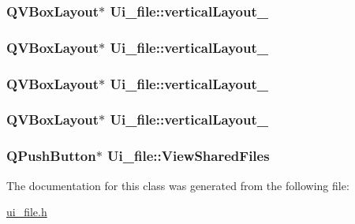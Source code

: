 \hypertarget{classUi__file_af4fc003905e3e81c7d73c594b065ff41}{
\subsubsection[{vertical\-Layout\-\_\-3}]{\setlength{\rightskip}{0pt plus 5cm}Q\-V\-Box\-Layout$\ast$ Ui\-\_\-file\-::vertical\-Layout\-\_}}\label{classUi__file_af4fc003905e3e81c7d73c594b065ff41}
\hypertarget{classUi__file_a257693dbba46b1861288f832dc569ab7}{
\subsubsection[{vertical\-Layout\-\_\-4}]{\setlength{\rightskip}{0pt plus 5cm}Q\-V\-Box\-Layout$\ast$ Ui\-\_\-file\-::vertical\-Layout\-\_}}\label{classUi__file_a257693dbba46b1861288f832dc569ab7}
\hypertarget{classUi__file_aa82c6b5bf1b9b6930783e40ed2b316db}{
\subsubsection[{vertical\-Layout\-\_\-5}]{\setlength{\rightskip}{0pt plus 5cm}Q\-V\-Box\-Layout$\ast$ Ui\-\_\-file\-::vertical\-Layout\-\_}}\label{classUi__file_aa82c6b5bf1b9b6930783e40ed2b316db}
\hypertarget{classUi__file_af41ed9af58e8d5bf56fb62fb9f35fe8c}{
\subsubsection[{vertical\-Layout\-\_\-7}]{\setlength{\rightskip}{0pt plus 5cm}Q\-V\-Box\-Layout$\ast$ Ui\-\_\-file\-::vertical\-Layout\-\_}}\label{classUi__file_af41ed9af58e8d5bf56fb62fb9f35fe8c}
\hypertarget{classUi__file_a13d0359dc69280547f741813c8ab521c}{
\subsubsection[{View\-Shared\-Files}]{\setlength{\rightskip}{0pt plus 5cm}Q\-Push\-Button$\ast$ Ui\-\_\-file\-::\-View\-Shared\-Files}}\label{classUi__file_a13d0359dc69280547f741813c8ab521c}


The documentation for this class was generated from the following file\-:\begin{DoxyCompactItemize}
\item 
\hyperlink{ui__file_8h}{ui\-\_\-file.\-h}\end{DoxyCompactItemize}

